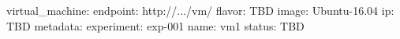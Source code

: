 virtual\_machine:
  endpoint: http://.../vm/
  flavor: TBD
  image: Ubuntu-16.04
  ip:
  \- TBD
  metadata:
    experiment: exp-001
  name: vm1
  status: TBD
